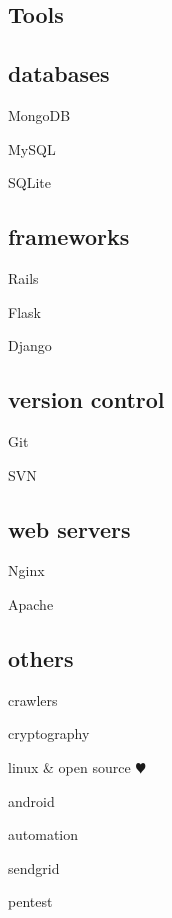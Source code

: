 \documentclass{article}
\def\emcolor{blue!25!black}
\newcommand{\fgem}{\color{\emcolor}}%
\newenvironment{aside}{%
\noindent
\begin{minipage}[t]{\dimexpr0.25\textwidth}%
\let\oldsection\section
\let\oldsubsection\subsection
\renewcommand{\section}[1]{\oldsection*{\fgem ##1}}
\renewcommand{\subsection}[1]{\oldsubsection*{\small ##1}\vspace{-0.5em}}
\begin{center}%
}{%
\end{center}%
\let\subsection\oldsubsection
\let\section\oldsection
\end{minipage}%
}
\begin{document}
\begin{aside}
\section{Tools}
\subsection{databases}
\begin{itemize*}
\item{MongoDB}
\item{MySQL}
\item{SQLite}
\end{itemize*}

\subsection{frameworks}
\begin{itemize*}
\item{Rails}
\item{Flask}
\item{Django}
\end{itemize*}

\subsection{version control}
\begin{itemize*}
\item{Git}
\item{SVN}
\end{itemize*}

\subsection{web servers}
\begin{itemize*}
\item{Nginx}
\item{Apache}
\end{itemize*}

\subsection{others}
\begin{itemize*}
\item{crawlers}
\item{cryptography}
\item{linux \& open source \color{red}$\varheartsuit$}
\item{android}
\item{automation}
\item{sendgrid}
\item{pentest}
\end{itemize*}


\end{aside}%
\end{document}
